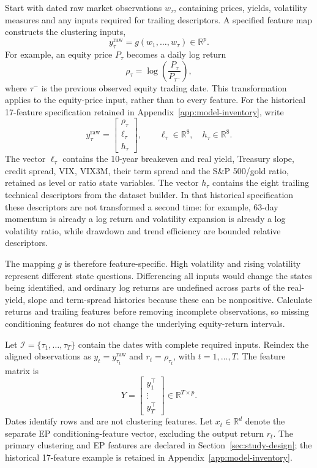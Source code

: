 \documentclass[11pt,a4paper]{article}
\begin{document}
Start with dated raw market observations $w_\tau$, containing prices, yields, volatility measures and any inputs required for trailing descriptors. A specified feature map constructs the clustering inputs,
\begin{equation}
y_\tau^{\mathrm{raw}}=g(w_1,\ldots,w_\tau)\in\mathbb R^p.
\end{equation}
For example, an equity price $P_\tau$ becomes a daily log return
\begin{equation}
\rho_\tau=\log\!\left(\frac{P_\tau}{P_{\tau^-}}\right),
\end{equation}
where $\tau^-$ is the previous observed equity trading date. This transformation applies to the equity-price input, rather than to every feature. For the historical 17-feature specification retained in Appendix~\ref{app:model-inventory}, write
\begin{equation}
y_\tau^{\mathrm{raw}}=
\begin{bmatrix}\rho_\tau\\ \ell_\tau\\ h_\tau\end{bmatrix},
\qquad \ell_\tau\in\mathbb R^8,\quad h_\tau\in\mathbb R^8.
\end{equation}
The vector $\ell_\tau$ contains the 10-year breakeven and real yield, Treasury slope, credit spread, VIX, VIX3M, their term spread and the S\&P 500/gold ratio, retained as level or ratio state variables. The vector $h_\tau$ contains the eight trailing technical descriptors from the dataset builder. In that historical specification these descriptors are not transformed a second time: for example, 63-day momentum is already a log return and volatility expansion is already a log volatility ratio, while drawdown and trend efficiency are bounded relative descriptors.

The mapping $g$ is therefore feature-specific. High volatility and rising volatility represent different state questions. Differencing all inputs would change the states being identified, and ordinary log returns are undefined across parts of the real-yield, slope and term-spread histories because these can be nonpositive. Calculate returns and trailing features before removing incomplete observations, so missing conditioning features do not change the underlying equity-return intervals.

Let $\mathcal I=\{\tau_1,\ldots,\tau_T\}$ contain the dates with complete required inputs. Reindex the aligned observations as $y_t=y_{\tau_t}^{\mathrm{raw}}$ and $r_t=\rho_{\tau_t}$, with $t=1,\ldots,T$. The feature matrix is
\begin{equation}
Y=\begin{bmatrix}y_1^\top\\ \vdots\\ y_T^\top\end{bmatrix}
\in\mathbb R^{T\times p}.
\end{equation}
Dates identify rows and are not clustering features. Let $x_t\in\mathbb R^d$ denote the separate EP conditioning-feature vector, excluding the output return $r_t$. The primary clustering and EP features are declared in Section~\ref{sec:study-design}; the historical 17-feature example is retained in Appendix~\ref{app:model-inventory}.
\end{document}
